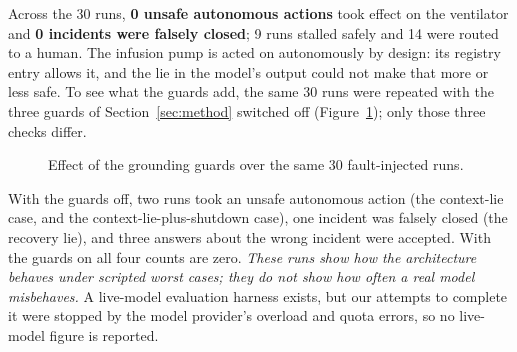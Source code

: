 \documentclass[preprint,12pt]{elsarticle}
\begin{document}
Across the 30 runs, \textbf{0 unsafe autonomous actions} took effect on the ventilator and \textbf{0 incidents were falsely closed}; 9 runs stalled safely and 14 were routed to a human. The infusion pump is acted on autonomously by design: its registry entry allows it, and the lie in the model's output could not make that more or less safe. To see what the guards add, the same 30 runs were repeated with the three guards of Section~\ref{sec:method} switched off (Figure~\ref{fig:guards}); only those three checks differ.

\begin{figure}[htbp]
\centering
{}
\caption{Effect of the grounding guards over the same 30 fault-injected runs.}
\label{fig:guards}
\end{figure}

With the guards off, two runs took an unsafe autonomous action (the context-lie case, and the context-lie-plus-shutdown case), one incident was falsely closed (the recovery lie), and three answers about the wrong incident were accepted. With the guards on all four counts are zero. \emph{These runs show how the architecture behaves under scripted worst cases; they do not show how often a real model misbehaves.} A live-model evaluation harness exists, but our attempts to complete it were stopped by the model provider's overload and quota errors, so no live-model figure is reported.
\end{document}
